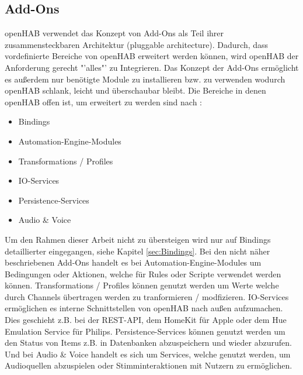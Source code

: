 \subsection{Add-Ons}\label{sec:add-ons}
openHAB verwendet das Konzept von Add-Ons als Teil ihrer zusammensteckbaren Architektur (pluggable architecture). Dadurch, dass vordefinierte Bereiche von openHAB erweitert werden können, wird openHAB der Anforderung gerecht "'alles"' zu Integrieren. Das Konzept der Add-Ons ermöglicht es außerdem nur benötigte Module zu installieren bzw. zu verwenden wodurch openHAB schlank, leicht und überschaubar bleibt. Die Bereiche in denen openHAB offen ist, um erweitert zu werden sind nach \cite{openHAB04:OH}:
\begin{itemize}
	\item Bindings
	\item Automation-Engine-Modules
	\item Transformations / Profiles
	\item IO-Services
	\item Persistence-Services
	\item Audio \& Voice
\end{itemize}
Um den Rahmen dieser Arbeit nicht zu übersteigen wird nur auf Bindings detaillierter eingegangen, siehe Kapitel \ref{sec:Bindings}. Bei den nicht näher beschriebenen Add-Ons handelt es bei Automation-Engine-Modules um Bedingungen oder Aktionen, welche für Rules oder Scripte verwendet werden können. Transformations / Profiles können genutzt werden um Werte welche durch Channels übertragen werden zu tranformieren / modfizieren. IO-Services ermöglichen es interne Schnittstellen von openHAB nach außen aufzumachen. Dies geschieht z.B. bei der REST-API, dem HomeKit für Apple oder dem Hue Emulation Service für Philips. Persistence-Services können genutzt werden um den Status von Items z.B. in Datenbanken abzuspeichern und wieder abzurufen. Und bei Audio \& Voice handelt es sich um Services, welche genutzt werden, um Audioquellen abzuspielen oder Stimminteraktionen mit Nutzern zu ermöglichen.

